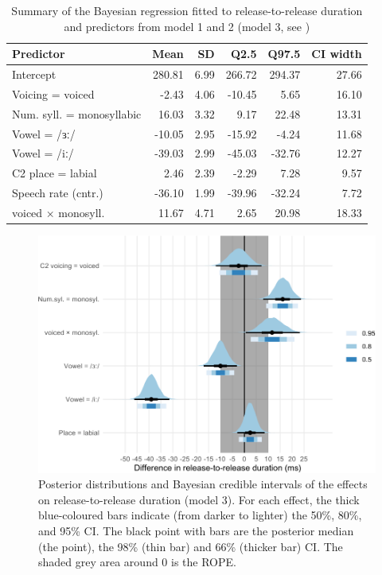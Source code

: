 \documentclass[12pt,a4paper,]{article}
\begin{document}
\begin{table}

\caption{\label{tab:rr-3-table}Summary of the Bayesian regression fitted to release-to-release duration and predictors from model 1 and 2 (model 3, see )}
\centering
\fontsize{8}{10}\selectfont
\begin{tabular}[t]{lrrrrr}
\toprule
Predictor & Mean & SD & Q2.5 & Q97.5 & CI width\\
\midrule
Intercept & 280.81 & 6.99 & 266.72 & 294.37 & 27.66\\
Voicing = voiced & -2.43 & 4.06 & -10.45 & 5.65 & 16.10\\
Num. syll. = monosyllabic & 16.03 & 3.32 & 9.17 & 22.48 & 13.31\\
Vowel = /ɜː/ & -10.05 & 2.95 & -15.92 & -4.24 & 11.68\\
Vowel = /iː/ & -39.03 & 2.99 & -45.03 & -32.76 & 12.27\\
C2 place = labial & 2.46 & 2.39 & -2.29 & 7.28 & 9.57\\
Speech rate (cntr.) & -36.10 & 1.99 & -39.96 & -32.24 & 7.72\\
voiced × monosyll. & 11.67 & 4.71 & 2.65 & 20.98 & 18.33\\
\bottomrule
\end{tabular}
\end{table}

\begin{figure}
\includegraphics[width=\linewidth]{2019-english-rr_files/figure-latex/rr-3-intervals-1} \caption{Posterior distributions and Bayesian credible intervals of the effects on release-to-release duration (model 3). For each effect, the thick blue-coloured bars indicate (from darker to lighter) the 50\%, 80\%, and 95\% CI. The black point with bars are the posterior median (the point), the 98\% (thin bar) and 66\% (thicker bar) CI. The shaded grey area around 0 is the ROPE.}\label{f:rr-3-intervals}
\end{figure}
\end{document}
